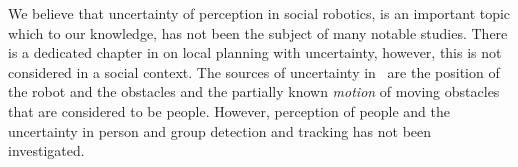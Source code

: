 We believe that uncertainty of perception in social robotics, is an important topic which to our knowledge, has not been the subject of many notable studies. There is a dedicated chapter in \cite{correa2014uncertainty} on local planning with uncertainty, however, this is not considered in a social context. The sources of uncertainty in~\cite{correa2014uncertainty} are the position of the robot and the obstacles and the partially known \emph{motion} of moving obstacles that are considered to be people. However, perception of people and the uncertainty in person and group detection and tracking has not been investigated.


